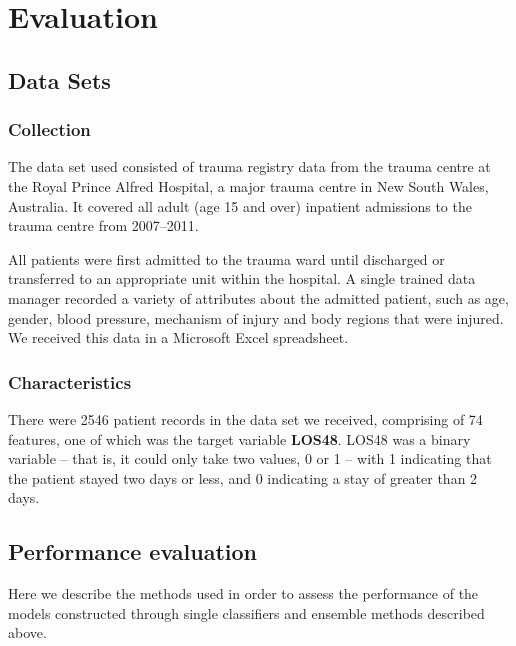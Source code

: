 \chapter{Evaluation} \label{chap:evaluation}

\section{Data Sets}
\subsection{Collection}
The data set used consisted of trauma registry data from the trauma centre
at the Royal Prince Alfred Hospital, a major trauma centre in New South Wales,
Australia. It covered all adult (age 15 and over) inpatient admissions to the
trauma centre from 2007--2011. 

All patients were first admitted to the trauma ward until discharged
or transferred to an appropriate unit within the hospital. A single trained
data manager recorded a variety of attributes about the admitted patient,
such as age, gender, blood pressure, mechanism of injury and body regions
that were injured. We received this data in a Microsoft Excel spreadsheet.

\subsection{Characteristics}
There were 2546 patient records in the data set we received, comprising of 74
features, one of which was the target variable \textbf{LOS48}. LOS48 was a
binary variable -- that is, it could only take two values, 0 or 1 -- with 1
indicating that the patient stayed two days or less, and 0 indicating a stay
of greater than 2 days.


\section{Performance evaluation} %
\label{sec:perfeval}
Here we describe the methods used in order to assess the performance of the
models constructed through single classifiers and ensemble methods described
above.

